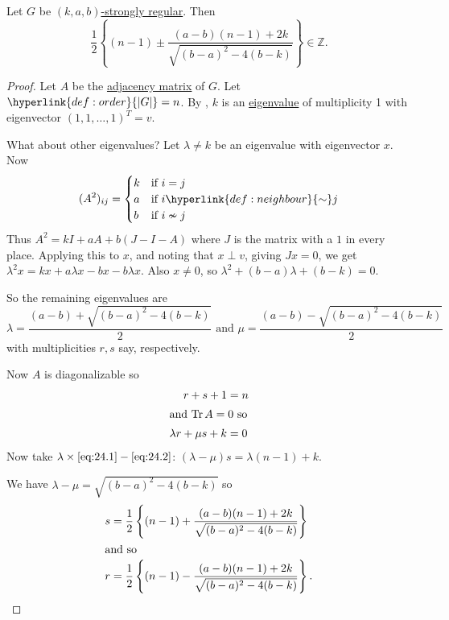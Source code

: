 \documentclass{article}
\DeclareMathOperator{\Tr}{Tr}
\begin{document}
\begin{nthm}\label{thm:47}
    Let $G$ be \hyperlink{def:sr}{$(k,a,b)$-strongly regular}.
    Then
    \begin{equation*}
        \frac{1}{2} \left\{ (n-1) \pm \frac{(a-b)(n-1) + 2k}{\sqrt{(b-a)^2 - 4(b-k)}}\right\} \in \mathbb{Z}.
    \end{equation*}
\end{nthm}
\begin{proof}
    Let $A$ be the \hyperlink{def:adj}{adjacency matrix} of $G$.
    Let $\hyperlink{def:order}{|G|}=n$.
    By , $k$ is an \hyperlink{def:eigen}{eigenvalue} of multiplicity 1 with eigenvector $(1,1,\dotsc,1)^T = v$.

    What about other eigenvalues?
    Let $\lambda \neq k$ be an eigenvalue with eigenvector $x$. Now
    \begin{equation*}
        (A^2)_{ij} =
        \begin{cases}
            k & \text{if } i = j \\
            a & \text{if } i \hyperlink{def:neighbour}{\sim} j \\
            b & \text{if } i \nsim j
        \end{cases}
    \end{equation*}
    Thus $A^2 = k I + aA + b(J-I-A)$ where $J$ is the matrix with a $1$ in every place.
    Applying this to $x$, and noting that $x \perp v$, giving $J x = 0$, we get $\lambda^2 x = k x + a \lambda x - b x - b \lambda x$.
    Also $x \neq 0$, so $\lambda^2 + (b-a) \lambda + (b-k) = 0$.

    So the remaining eigenvalues are
    \begin{equation*}
        \lambda = \frac{(a-b) + \sqrt{(b-a)^2 - 4(b-k)}}{2} \text{ and } \mu = \frac{(a-b) - \sqrt{(b-a)^2 - 4(b-k)}}{2}
    \end{equation*}
    with multiplicities $r,s$ say, respectively.

    Now $A$ is diagonalizable so
    \begin{align}
        r + s + 1 &= n \label{eq:24.1} \\
        \shortintertext{and $\Tr A = 0$ so}
        \lambda r + \mu s + k &= 0 \label{eq:24.2}
    \end{align}
    Now take $\lambda \times \eqref{eq:24.1} - \eqref{eq:24.2}$: $(\lambda - \mu) s = \lambda(n-1) + k$.

    We have $\lambda-\mu = \sqrt{(b-a)^2 - 4(b-k)}$ so
    \begin{align*}
        s &= \frac{1}{2} \left\{ (n-1) + \frac{(a-b)(n-1) + 2k}{\sqrt{(b-a)^2 - 4(b-k)}}\right\} \\
        \shortintertext{and so}
        r &= \frac{1}{2} \left\{ (n-1) - \frac{(a-b)(n-1) + 2k}{\sqrt{(b-a)^2 - 4(b-k)}}\right\}. \qedhere
    \end{align*}
\end{proof}
\end{document}
